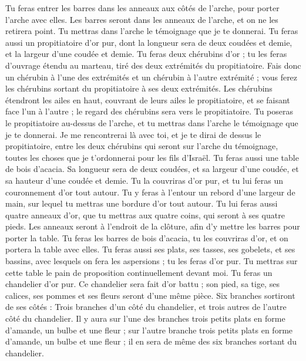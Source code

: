 \begin{multicols}{2}
Tu feras entrer les barres dans les anneaux aux côtés de l'arche, pour porter l'arche avec elles.
Les barres seront dans les anneaux de l'arche, et on ne les retirera point.
Tu mettras dans l'arche le témoignage que je te donnerai\FTNT{}.
Tu feras aussi un propitiatoire d’or pur, dont la longueur sera de deux coudées et demie, et la largeur d'une coudée et demie.
Tu feras deux chérubins d'or ; tu les feras d'ouvrage étendu au marteau, tiré des deux extrémités du propitiatoire.
Fais donc un chérubin à l'une des extrémités et un chérubin à l'autre extrémité ; vous ferez les chérubins sortant du propitiatoire à ses deux extrémités.
Les chérubins étendront les ailes en haut, couvrant de leurs ailes le propitiatoire, et se faisant face l’un à l’autre ; le regard des chérubins sera vers le propitiatoire\FTNT{}.
Tu poseras le propitiatoire au-dessus de l'arche, et tu mettras dans l'arche le témoignage que je te donnerai.
Je me rencontrerai là avec toi, et je te dirai de dessus le propitiatoire, entre les deux chérubins qui seront sur l'arche du témoignage, toutes les choses que je t’ordonnerai pour les fils d'Israël\FTNT{}.
Tu feras aussi une table de bois d’acacia. Sa longueur sera de deux coudées, et sa largeur d'une coudée, et sa hauteur d'une coudée et demie.
Tu la couvriras d’or pur, et tu lui feras un couronnement d'or tout autour.
Tu y feras à l’entour un rebord d’une largeur de main, sur lequel tu mettras une bordure d’or tout autour.
Tu lui feras aussi quatre anneaux d'or, que tu mettras aux quatre coins, qui seront à ses quatre pieds.
Les anneaux seront à l'endroit de la clôture, afin d'y mettre les barres pour porter la table.
Tu feras les barres de bois d’acacia, tu les couvriras d'or, et on portera la table avec elles.
Tu feras aussi ses plats, ses tasses, ses gobelets, et ses bassins, avec lesquels on fera les aspersions ; tu les feras d’or pur\FTNT{}.
Tu mettras sur cette table le pain de proposition continuellement devant moi\FTNT{}.
Tu feras un chandelier d’or pur\FTNT{}. Ce chandelier sera fait d’or battu ; son pied, sa tige, ses calices, ses pommes et ses fleurs seront d’une même pièce.
Six branches sortiront de ses côtés : Trois branches d'un côté du chandelier, et trois autres de l'autre côté du chandelier.
Il y aura sur l’une des branches trois petits plats en forme d'amande, un bulbe et une fleur ; sur l'autre branche trois petits plats en forme d'amande, un bulbe et une fleur ; il en sera de même des six branches sortant du chandelier.

\end{multicols}
